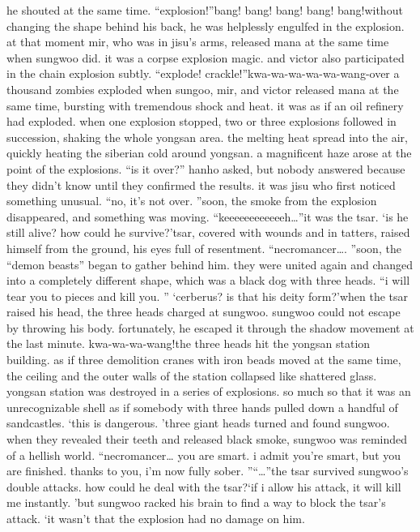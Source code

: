 he shouted at the same time.
“explosion!”bang! bang! bang! bang! bang!without changing the shape behind his back, he was helplessly engulfed in the explosion.
at that moment mir, who was in jisu’s arms, released mana at the same time when sungwoo did.
 it was a corpse explosion magic.
 and victor also participated in the chain explosion subtly.
“explode! crackle!”kwa-wa-wa-wa-wa-wang-over a thousand zombies exploded when sungoo, mir, and victor released mana at the same time, bursting with tremendous shock and heat.
 it was as if an oil refinery had exploded.
when one explosion stopped, two or three explosions followed in succession, shaking the whole yongsan area.
the melting heat spread into the air, quickly heating the siberian cold around yongsan.
 a magnificent haze arose at the point of the explosions.
“is it over?” hanho asked, but nobody answered because they didn’t know until they confirmed the results.
it was jisu who first noticed something unusual.
“no, it’s not over.
”soon, the smoke from the explosion disappeared, and something was moving.
“keeeeeeeeeeeeh…”it was the tsar.
‘is he still alive? how could he survive?’tsar, covered with wounds and in tatters, raised himself from the ground, his eyes full of resentment.
“necromancer….
”soon, the “demon beasts” began to gather behind him.
 they were united again and changed into a completely different shape, which was a black dog with three heads.
“i will tear you to pieces and kill you.
”
‘cerberus? is that his deity form?’when the tsar raised his head, the three heads charged at sungwoo.
 sungwoo could not escape by throwing his body.
 fortunately, he escaped it through the shadow movement at the last minute.
kwa-wa-wa-wang!the three heads hit the yongsan station building.
 as if three demolition cranes with iron beads moved at the same time, the ceiling and the outer walls of the station collapsed like shattered glass.
yongsan station was destroyed in a series of explosions.
 so much so that it was an unrecognizable shell as if somebody with three hands pulled down a handful of sandcastles.
‘this is dangerous.
’three giant heads turned and found sungwoo.
 when they revealed their teeth and released black smoke, sungwoo was reminded of a hellish world.
“necromancer… you are smart.
 i admit you’re smart, but you are finished.
 thanks to you, i’m now fully sober.
”“…”the tsar survived sungwoo’s double attacks.
 how could he deal with the tsar?‘if i allow his attack, it will kill me instantly.
’but sungwoo racked his brain to find a way to block the tsar’s attack.
‘it wasn’t that the explosion had no damage on him.
